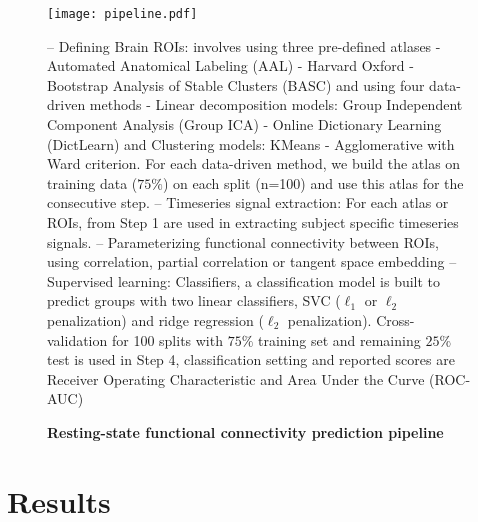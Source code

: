 \documentclass[5p]{elsarticle}
\begin{document}
\begin{figure*}[t]
    \setlength{\fboxsep}{0pt}%
    \begin{minipage}[T]{.26\paperwidth}
     \texttt{[image: pipeline.pdf]}%
    \medskip
    \end{minipage}
    \caption{\textbf{Resting-state functional connectivity prediction pipeline}}

    {\bfseries{}} -- Defining Brain ROIs: involves using three
    pre-defined atlases - Automated Anatomical Labeling (AAL) - Harvard Oxford
    - Bootstrap Analysis of Stable Clusters (BASC) and using four data-driven
    methods - Linear decomposition models: Group Independent Component
    Analysis (Group ICA) - Online Dictionary Learning (DictLearn) and
    Clustering models: KMeans - Agglomerative with Ward criterion. For each
    data-driven method, we build the atlas on training data ($75\%$) on each
    split (n=100) and use this atlas for the consecutive step. 
    {\bfseries{}} -- Timeseries signal extraction: For each atlas or
    ROIs, from Step 1 are used in extracting subject specific timeseries signals.
    {\bfseries{}} -- Parameterizing functional connectivity between
    ROIs,  using  correlation,  partial  correlation  or  tangent  space
    embedding
    {\bfseries{}} -- Supervised learning: Classifiers, a classification
    model is built to predict groups with two linear classifiers, SVC ($\ell_{1}$ or
    $\ell_{2}$ penalization) and ridge regression ($\ell_{2}$ penalization).
    Cross-validation for 100 splits with $75\%$ training set and remaining
    $25\%$ test is used in Step 4, classification setting and reported scores
    are Receiver Operating Characteristic and Area Under the Curve (ROC-AUC)
    \label{fig:pipeline}
\end{figure*}



\section{Results}
\end{document}
